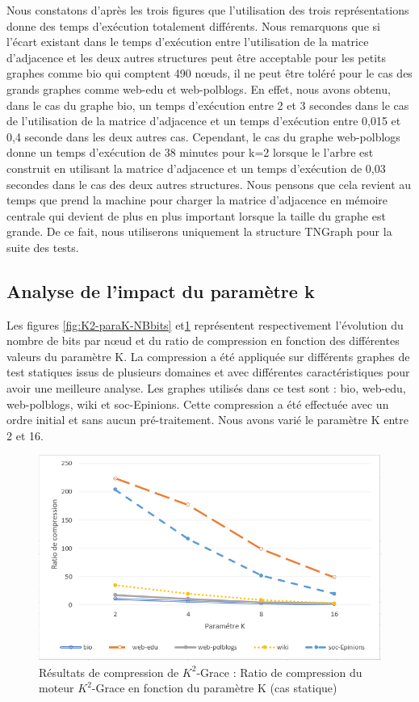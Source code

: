 Nous constatons d'après les trois figures que l'utilisation des trois représentations donne des temps d'exécution totalement différents. Nous remarquons que si l'écart existant dans le temps d'exécution  entre l'utilisation de la matrice d'adjacence  et les deux autres structures peut être acceptable pour les petits graphes comme bio qui comptent 490 nœuds, il ne peut être toléré pour le cas des grands graphes comme web-edu et web-polblogs.
En effet, nous avons obtenu, dans le cas du graphe bio, un temps d'exécution entre 2 et 3 secondes dans le cas de l'utilisation de la matrice d'adjacence et un temps d'exécution entre 0,015 et 0,4 seconde dans les deux autres cas. Cependant, le cas du graphe web-polblogs donne un temps d'exécution de 38 minutes pour k=2 lorsque le l'arbre est construit en utilisant la matrice d'adjacence et un temps d'exécution de 0,03 secondes dans le cas des deux autres structures. Nous pensons que cela revient au temps que prend la machine pour charger la matrice d'adjacence en mémoire centrale qui devient de plus en plus important lorsque la taille du graphe est grande. De ce fait, nous utiliserons uniquement la structure TNGraph pour la suite des tests.

			\subsection{Analyse de l'impact du paramètre k}
			Les figures \ref{fig:K2-paraK-NBbits} et\ref{fig:K2-paraK-Ratio} représentent respectivement l'évolution du nombre de bits par nœud et du ratio de compression en fonction des différentes valeurs du paramètre K. La compression a été appliquée sur différents graphes de test statiques issus de plusieurs domaines et avec différentes caractéristiques pour avoir une meilleure analyse. Les graphes utilisés dans ce test sont : bio, web-edu, web-polblogs, wiki et soc-Epinions. Cette compression a été effectuée avec un ordre initial et sans aucun pré-traitement.
 Nous avons varié le paramètre K entre 2 et 16.
			
\begin{figure}[H]
	\centering
	\includegraphics[scale=0.8]{ressources/image/Tests/K2-paraK-Ratio.png}
	
	\caption{Résultats de compression de $K^2$-Grace : Ratio de compression du moteur $K^2$-Grace en fonction du paramètre K (cas statique)}
	\label{fig:K2-paraK-Ratio}
\end{figure}


